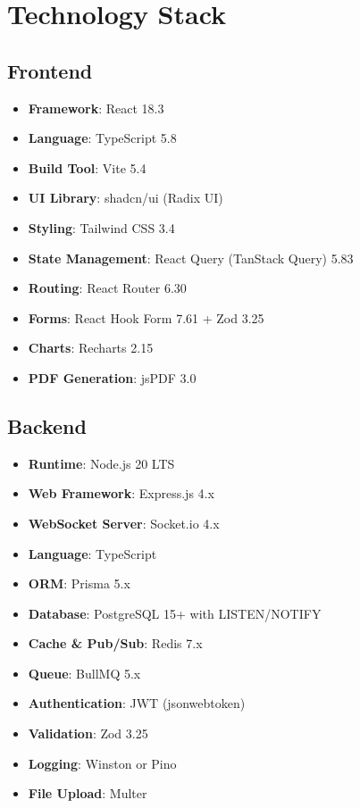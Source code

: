 \documentclass[11pt,a4paper]{article}
\begin{document}
\section{Technology Stack}

\subsection{Frontend}
\begin{itemize}
    \item \textbf{Framework}: React 18.3
    \item \textbf{Language}: TypeScript 5.8
    \item \textbf{Build Tool}: Vite 5.4
    \item \textbf{UI Library}: shadcn/ui (Radix UI)
    \item \textbf{Styling}: Tailwind CSS 3.4
    \item \textbf{State Management}: React Query (TanStack Query) 5.83
    \item \textbf{Routing}: React Router 6.30
    \item \textbf{Forms}: React Hook Form 7.61 + Zod 3.25
    \item \textbf{Charts}: Recharts 2.15
    \item \textbf{PDF Generation}: jsPDF 3.0
\end{itemize}

\subsection{Backend}
\begin{itemize}
    \item \textbf{Runtime}: Node.js 20 LTS
    \item \textbf{Web Framework}: Express.js 4.x
    \item \textbf{WebSocket Server}: Socket.io 4.x
    \item \textbf{Language}: TypeScript
    \item \textbf{ORM}: Prisma 5.x
    \item \textbf{Database}: PostgreSQL 15+ with LISTEN/NOTIFY
    \item \textbf{Cache \& Pub/Sub}: Redis 7.x
    \item \textbf{Queue}: BullMQ 5.x
    \item \textbf{Authentication}: JWT (jsonwebtoken)
    \item \textbf{Validation}: Zod 3.25
    \item \textbf{Logging}: Winston or Pino
    \item \textbf{File Upload}: Multer
\end{itemize}
\end{document}
